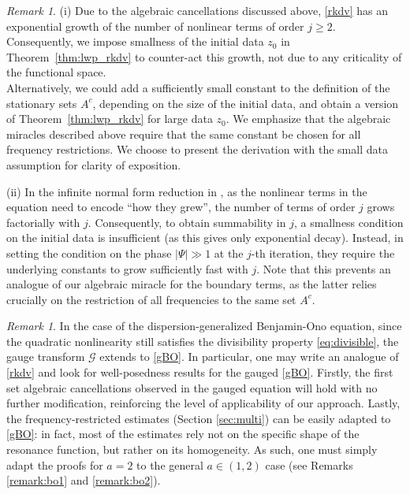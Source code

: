 \documentclass[a4paper,
11pt,  reqno]{amsart}
\newcommand{\5}{\textup{V}}
\newcommand{\noi}{\noindent}
\theoremstyle{remark}
\newtheorem{remark}[theorem]{Remark}
\newcommand{\Gc}{\mathcal{G}}
\numberwithin{equation}{section}
\numberwithin{theorem}{section}
\begin{document}
\begin{remark}
\rm

(i) Due to the  algebraic cancellations discussed above, \eqref{rkdv} has an exponential growth of the number of nonlinear terms of order $j\ge 2$. Consequently, we impose smallness of the initial data $z_0$ in Theorem~\ref{thm:lwp_rkdv} to counter-act this growth, not due to any criticality of the functional space.
\\
Alternatively, we could add a sufficiently small constant to the definition of the stationary sets $A^c$, depending on the size of the initial data, and obtain a version of Theorem~\ref{thm:lwp_rkdv} for large data $z_0$. We emphasize that the algebraic miracles described above require that the same constant be chosen for all frequency restrictions.
We choose to present the derivation with the small data assumption for clarity of exposition.


\smallskip
\noi
(ii) In the infinite normal form reduction in \cite{GuoKwonOh_nls, kishimoto}, as the nonlinear terms in the equation need to encode ``how they grew'', the number of terms of order $j$ grows factorially with $j$. Consequently, to obtain summability in $j$, a smallness condition on the initial data is insufficient (as this gives only exponential decay). Instead, in setting the condition on the phase $|\Psi| \gg 1$ at the $j$-th iteration, they require the underlying constants to grow sufficiently fast with $j$.
Note that this prevents an analogue of our algebraic miracle for the boundary terms, as the latter relies crucially on the restriction of all frequencies to the same set $A^c$.






\end{remark}

\begin{remark}\label{remark:dgbo} In the case of the dispersion-generalized Benjamin-Ono equation, 
since the quadratic nonlinearity still satisfies the divisibility property \eqref{eq:divisible},  the gauge transform $\Gc$ extends to \eqref{gBO}.
In particular, one may write an analogue of \eqref{rkdv} and look for well-posedness results for the gauged \eqref{gBO}. Firstly, the first set algebraic cancellations observed in the gauged equation will hold with no further modification, reinforcing the level of applicability of our approach. Lastly, the frequency-restricted estimates (Section \ref{sec:multi}) can be easily adapted to \eqref{gBO}: in fact, most of the estimates rely not on the specific shape of the resonance function, but rather on its homogeneity. As such, one must simply adapt the proofs for $a=2$  to the general $a\in(1,2)$ case (see Remarks \ref{remark:bo1} and \ref{remark:bo2}).

\end{remark}
\end{document}
